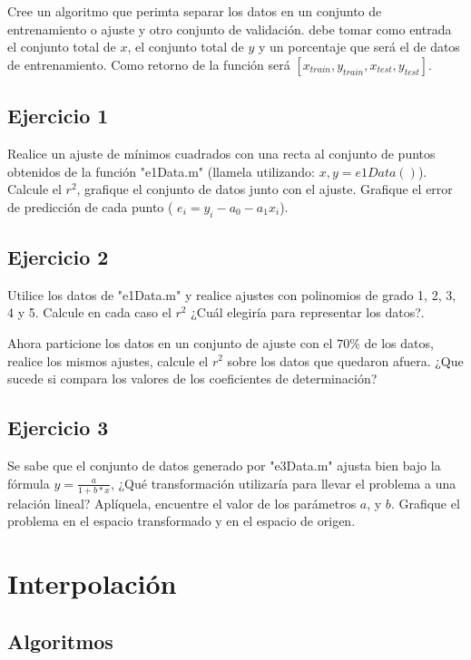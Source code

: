 \documentclass[a4paper,11pt]{article}
\theoremstyle{mytheor}
\begin{document}
\begin{enumerate}[label=\Roman*]
Cree un algoritmo que perimta separar los datos en un conjunto de entrenamiento o ajuste y otro conjunto de validación. debe tomar como entrada el conjunto total de $x$, el conjunto total de $y$ y un porcentaje  que será el de datos de entrenamiento. Como retorno de la función será $[x_{train},y_{train},x_{test},y_{test}]$.



\end{enumerate}

\subsection*{Ejercicio 1}
Realice un ajuste de mínimos cuadrados con una recta al conjunto de puntos obtenidos de la función "e1Data.m" (llamela utilizando: $x,y = e1Data()$). Calcule el $r^2$, grafique el conjunto de datos junto con el ajuste. Grafique el error de predicción de cada punto ( $e_i = y_i - a_0 -a_1 x_i$).

\subsection*{Ejercicio 2}
Utilice los datos de "e1Data.m" y realice ajustes con polinomios de grado 1, 2, 3, 4 y 5. Calcule en cada caso el $r^2$ ¿Cuál elegiría para representar los datos?. 

Ahora particione los datos en un conjunto de ajuste con el $70\%$ de los datos, realice los mismos ajustes, calcule el $r^2$ sobre los datos que quedaron afuera. ¿Que sucede si compara los valores de los coeficientes de determinación?

\subsection*{Ejercicio 3}

Se sabe que el conjunto de datos generado por "e3Data.m" ajusta bien bajo la fórmula $y = \frac{a}{1+b*x}$, ¿Qué transformación utilizaría para llevar el problema a una relación lineal? Aplíquela, encuentre el valor de los parámetros $a$, y $b$. Grafique el problema en el espacio transformado y en el espacio de origen.




\section*{Interpolación}

\subsection*{Algoritmos}
\end{document}
